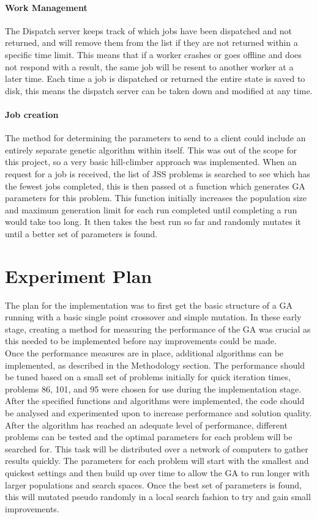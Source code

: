 \documentclass[14pt]{acmsiggraph}
\begin{document}
	\paragraph{Work Management}
	The Dispatch server keeps track of which jobs have been dispatched and not returned, and will remove them from the list if they are not returned within a specific time limit. This means that if a worker crashes or goes offline and does not respond with a result, the same job will be resent to another worker at a later time. Each time a job is dispatched or returned the entire state is saved to disk, this means the dispatch server can be taken down and modified at any time.
	
	\paragraph{Job creation}
	The method for determining the parameters to send to a client could include an entirely separate genetic algorithm within itself. This was out of the scope for this project, so a very basic hill-climber approach was implemented. When an request for a job is received, the list of JSS problems is searched to see which has the fewest jobs completed, this is then passed ot a function which generates GA parameters for this problem. This function initially increases the population size and maximum generation limit for each run completed until completing a run would take too long. It then takes the best run so far and randomly mutates it until a better set of parameters is found.
	
	\section{Experiment Plan}
	The plan for the implementation was to first get the basic structure of a GA running with a basic single point crossover and simple mutation. In these early stage, creating a method for measuring the performance of the GA was crucial as this needed to be implemented before nay improvements could be made. \\
	Once the performance measures are in place, additional algorithms can be implemented, as described in the Methodology section. The performance should be tuned based on a small set of problems initially for quick iteration times, problems 86, 101, and 95 were chosen for use during the implementation stage.\\
	After the specified functions and algorithms were implemented, the code should be analysed and experimented upon to increase performance and solution quality.\\
	After the algorithm has reached an adequate level of performance, different problems can be tested and the optimal parameters for each problem will be searched for. This task will be distributed over a network of computers to gather results quickly. The parameters for each problem will start with the smallest and quickest settings and then build up over time to allow the GA to run longer with larger populations and search spaces. Once the best set of parameters is found, this will mutated pseudo randomly in a local search fashion to try and gain small improvements.
	
\end{document}
